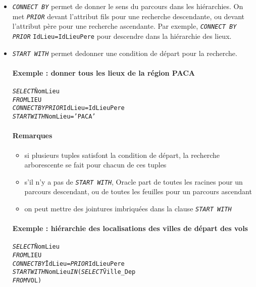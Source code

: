 \documentclass[10pt]{article}
\begin{document}
				\begin{itemize}
					\item \emph{\texttt{CONNECT BY}} permet de donner le sens du parcours dans les hiérarchies. On met \emph{\texttt{PRIOR}} devant l'attribut fils pour une recherche descendante, ou devant l'attribut père pour une recherche ascendante. Par exemple, \emph{\texttt{CONNECT BY PRIOR}} \texttt{IdLieu=IdLieuPere} pour descendre dans la hiérarchie des lieux.
					
					\item \emph{\texttt{START WITH}} permet dedonner une condition de départ pour la recherche.
							\paragraph{Exemple : donner tous les lieux de la région PACA}
								\begin{alltt}
									\begin{tabbing}
										\emph{SELECT} \= NomLieu\\
										\emph{FROM} \>LIEU\\
										\emph{CONNECT BY} \= \emph{PRIOR} IdLieu=IdLieuPere\\
														\>\emph{START WITH} NomLieu='PACA'
									\end{tabbing}
								\end{alltt}
							
							\paragraph{Remarques}
								\begin{itemize}
									\item si plusieurs tuples satisfont la condition de départ, la recherche arborescente se fait pour chacun de ces tuples
									\item s'il n'y a pas de \emph{\texttt{START WITH}}, Oracle part de toutes les racines pour un parcours descendant, ou de toutes les feuilles pour un parcours ascendant
									\item on peut mettre des jointures imbriquées dans la clause \emph{\texttt{START WITH}}
								\end{itemize}
								
							\paragraph{Exemple : hiérarchie des localisations des villes de départ des vols}
								\begin{alltt}
									\begin{tabbing}
										\emph{SELECT} \= NomLieu\\
										\emph{FROM} \> LIEU\\
										\emph{CONNECT BY} \=IdLieu=\emph{PRIOR} IdLieuPere\\
														\>\emph{START WITH} NomLieu \emph{IN} (\=\emph{SELECT} \=Ville_Dep\=\\
																								\>\>\emph{FROM}\>VOL\>)
									\end{tabbing}
								\end{alltt}
								

\end{itemize}
\end{document}
